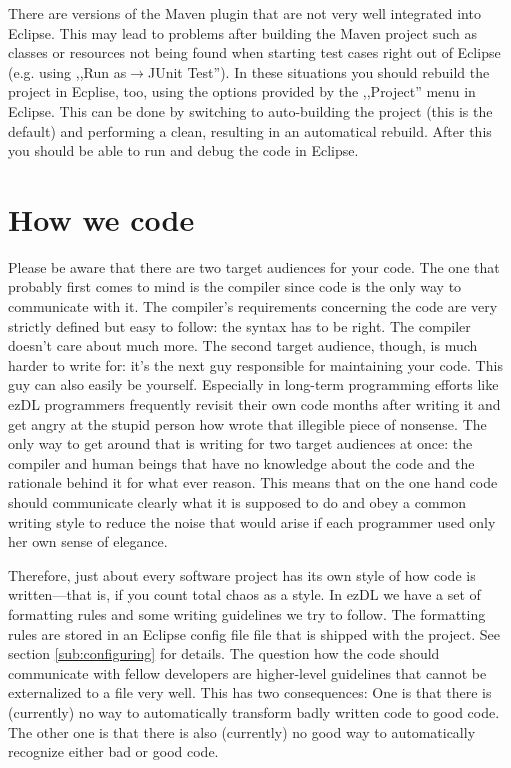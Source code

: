 \documentclass[12pt]{book}
\begin{document}
There are versions of the Maven plugin that are not very well integrated into Eclipse. This may lead to problems after building the Maven project such as classes or resources not being found when starting test cases right out of Eclipse (e.g. using ,,Run as$\rightarrow$JUnit Test''). In these situations you should rebuild the project in Ecplise, too, using the options provided by the ,,Project'' menu in Eclipse. This can be done by switching to auto-building the project (this is the default) and performing a clean, resulting in an automatical rebuild. After this you should be able to run and debug the code in Eclipse.



%
%
%
%
%
\chapter{How we code}

Please be aware that there are two target audiences for your code. The one that probably first comes to mind is the compiler since code is the only way to communicate with it. The compiler's requirements concerning the code are very strictly defined but easy to follow: the syntax has to be right. The compiler doesn't care about much more. The second target audience, though, is much harder to write for: it's the next guy responsible for maintaining your code. This guy can also easily be yourself. Especially in long-term programming efforts like ezDL programmers frequently revisit their own code months after writing it and get angry at the stupid person how wrote that illegible piece of nonsense. The only way to get around that is writing for two target audiences at once: the compiler and human beings that have no  knowledge about the code and the rationale behind it for what ever reason. This means that on the one hand code should communicate clearly what it is supposed to do and obey a common writing style to reduce the noise that would arise if each programmer used only her own sense of elegance.

Therefore, just about every software project has its own style of how code is written---that is, if you count total chaos as a style. In ezDL we have a set of formatting rules and some writing guidelines we try to follow. The formatting rules are stored in an Eclipse config file file that is shipped with the project. See section \ref{sub:configuring} for details. The question how the code should communicate with fellow developers are higher-level guidelines that cannot be externalized to a file very well. This has two consequences: One is that there is (currently) no way to automatically transform badly written code to good code. The other one is that there is also (currently) no good way to automatically recognize either bad or good code. 
\end{document}
